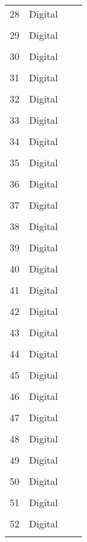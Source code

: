 \documentclass{article}
\begin{document}
\begin{longtable}{|l|l|l|l|}
28&Digital&&\\ &&&\\\hline
29&Digital&&\\ &&&\\\hline
30&Digital&&\\ &&&\\\hline
31&Digital&&\\ &&&\\\hline
32&Digital&&\\ &&&\\\hline
33&Digital&&\\ &&&\\\hline
34&Digital&&\\&&&\\ \hline
35&Digital&&\\ &&&\\\hline
36&Digital&&\\ &&&\\\hline
37&Digital&&\\ &&&\\\hline
38&Digital&&\\ &&&\\\hline
39&Digital&&\\ &&&\\\hline
40&Digital&&\\ &&&\\\hline
41&Digital&&\\ &&&\\\hline
42&Digital&&\\&&&\\ \hline
43&Digital&&\\&&&\\ \hline
44&Digital&&\\&&&\\ \hline
45&Digital&&\\&&&\\ \hline
46&Digital&&\\ &&&\\\hline
47&Digital&&\\&&&\\ \hline
48&Digital&&\\&&&\\ \hline
49&Digital&&\\&&&\\ \hline
50&Digital&&\\&&&\\ \hline
51&Digital&&\\ &&&\\\hline
52&Digital&&\\ &&&\\\hline

\end{longtable}
\end{document}
